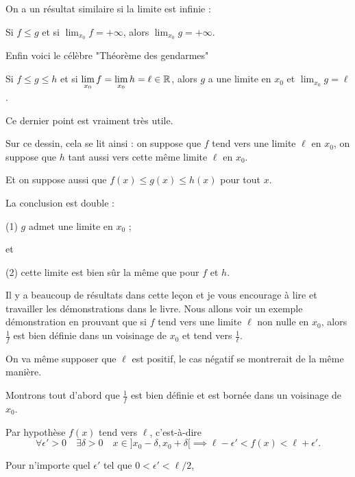 \change

On a un résultat similaire si la limite est infinie :

Si $f\leq g$ et si $\displaystyle\lim_{x_0} f=+\infty$, 
alors  $\displaystyle\lim_{x_0} g=+\infty$.

\change

Enfin voici le célèbre "Théorème des gendarmes"

Si $f\leq g\leq h$ et si 
$\displaystyle\lim_{x_0} f=\displaystyle\lim_{x_0} h=\ell\in\mathbb{R}$, 
alors $g$ a une limite en $x_0$ et $\displaystyle\lim_{x_0} g=\ell$.


\change

Ce dernier point est vraiment très utile.

Sur ce dessin, cela se lit ainsi : on suppose que $f$ tend vers une limite $\ell$
en $x_0$, on  suppose que $h$ tant aussi vers cette même limite $\ell$ en $x_0$.

Et on suppose aussi que $f(x) \le g(x) \le h(x)$ pour tout $x$.

La conclusion est double :

(1) $g$ admet une limite en $x_0$ ;

et

(2) cette limite est bien sûr la même que pour $f$ et $h$.


\diapo

Il y a beaucoup de résultats dans cette leçon et je vous encourage à lire et travailler
les démonstrations dans le livre. Nous allons voir un exemple démonstration
en prouvant que 
si $f$ tend vers une limite $\ell$ non nulle en $x_0$, 
alors $\frac 1 f$ est bien définie dans un voisinage de $x_0$ et tend vers $\frac 1\ell$.

On va même supposer que $\ell$ est positif, le cas négatif se montrerait de la même manière.

\change


Montrons tout d'abord que $\frac 1 f$ est bien définie et est bornée dans un voisinage de $x_0$.

\change

Par hypothèse $f(x)$ tend vers $\ell$, c'est-à-dire 
\[
\forall \epsilon'>0 \quad \exists \delta>0 \quad  x\in ] x_0-\delta,x_0+\delta[ 
\implies \ell-\epsilon' < f(x) <\ell+\epsilon'.
\]


\change

Pour n'importe quel  $\epsilon'$ tel que $0<\epsilon'<\ell/2$,


\change


